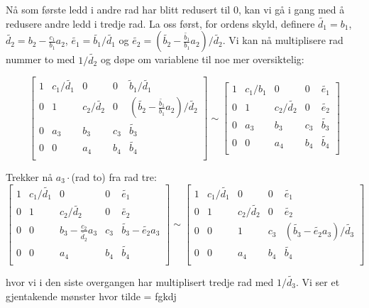 \documentclass{article}
\begin{document}
Nå som første ledd i andre rad har blitt redusert til 0, kan vi gå i gang med å redusere andre ledd i tredje rad. La oss først, for ordens skyld, definere $\tilde{d_1} = b_1$, $\tilde{d_2} = b_2 - \frac{c_1}{b_1}a_2$, $\tilde{e_1} = \tilde{b_1}/\tilde{d_1}$ og $\tilde{e_2} =  (\tilde{b_2} - \frac{\tilde{b_1}}{b_1}a_2)/\tilde{d_2}$. Vi kan nå multiplisere rad nummer to med $1/\tilde{d_2}$ og døpe om variablene til noe mer oversiktelig: 

\[
\left[
\begin{array}{cccc|c}
1 & c_1/\tilde{d_1} & 0 & 0 & \tilde{b}_1/\tilde{d_1} \\
 0 & 1  &c_2/\tilde{d_2} &0 & (\tilde{b_2} - \frac{\tilde{b_1}}{b_1}a_2)/\tilde{d_2}\\
  0 & a_3 & b_3 & c_3 & \tilde{b_3}\\
  0 & 0 & a_4 & b_4 & \tilde{b_4}\\
\end{array}
\right] \sim
\left[
\begin{array}{cccc|c}
1 & c_1/b_1 & 0 & 0 & \tilde{e_1} \\
 0 & 1  &c_2/\tilde{d_2} &0 &\tilde{e_2}\\
  0 & a_3 & b_3 & c_3 & \tilde{b_3}\\
  0 & 0 & a_4 & b_4 & \tilde{b_4}\\
\end{array}
\right]
\]

Trekker nå $a_3 \cdot$(rad to) fra rad tre:
\[
\left[
\begin{array}{cccc|c}
1 & c_1/\tilde{d_1} & 0 & 0 & \tilde{e_1} \\
 0 & 1  &c_2/\tilde{d_2} &0 &\tilde{e_2}\\
  0 & 0 & b_3 - \frac{c_2}{\tilde{d_2}}a_3 & c_3 & \tilde{b_3} - \tilde{e_2}a_3\\
  0 & 0 & a_4 & b_4 & \tilde{b_4}\\
\end{array}
\right] \sim
\left[
\begin{array}{cccc|c}
1 & c_1/\tilde{d_1} & 0 & 0 & \tilde{e_1} \\
 0 & 1  &c_2/\tilde{d_2} &0 &\tilde{e_2}\\
  0 & 0 & 1 & c_3 &  (\tilde{b_3} - \tilde{e_2}a_3)/\tilde{d_3}\\
  0 & 0 & a_4 & b_4 & \tilde{b_4}\\
\end{array}
\right]
\]

hvor vi i den siste overgangen har multiplisert tredje rad med $1/\tilde{d_3}$. Vi ser et gjentakende mønster hvor tilde = fgkdj
\end{document}
